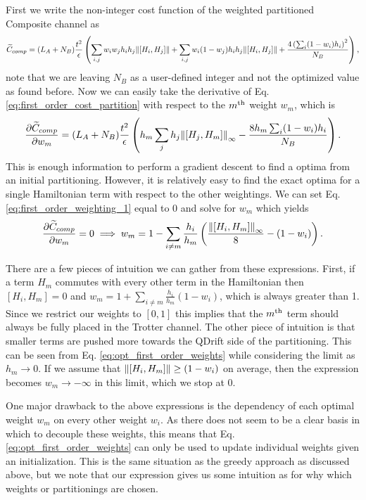 First we write the non-integer cost function of the weighted partitioned Composite channel as
\begin{equation}
    \widetilde{C}_{comp} = (L_A + N_B) \frac{t^2}{\epsilon} \left( \sum_{i,j} w_i w_j h_i h_j \norm{[H_i, H_j]} + \sum_{i, j} w_i (1 - w_j) h_i h_j \norm{[H_i, H_j]} + \frac{4 \left( \sum_i (1-w_i) h_i \right)^2 }{N_B}  \right), \label{eq:first_order_cost_partition}
\end{equation}
note that we are leaving $N_B$ as a user-defined integer and not the optimized value as found before. Now we can easily take the derivative of Eq. 
\eqref{eq:first_order_cost_partition} with respect to the $m\textsuperscript{th}$ weight $w_m$, which is
\begin{equation}
    \frac{\partial \widetilde{C}_{comp}}{\partial w_m} = (L_A + N_B) \frac{t^2}{\epsilon} \left(  h_m \sum_j h_j \norm{[H_j, H_m]}_\infty -  \frac{8 h_m \sum_i (1-w_i) h_i}{N_B}  \right) \label{eq:first_order_weighting_1}.
\end{equation}
This is enough information to perform a gradient descent to find a optima from an initial partitioning. However, it is relatively easy to
find the exact optima for a single Hamiltonian term with respect to the other weightings. We can set Eq. \eqref{eq:first_order_weighting_1} equal to 0 and solve for $w_m$ which yields
\begin{equation}
    \frac{\partial \widetilde{C}_{comp}}{\partial w_m} =0 \implies w_m = 1 - \sum_{i \neq m} \frac{h_i}{h_m} \left( \frac{\norm{[H_i, H_m]}_{\infty}}{8} - (1-w_i) \right). \label{eq:opt_first_order_weights}
\end{equation}

There are a few pieces of intuition we can gather from these expressions. First, if a term $H_m$ commutes with every other term in the Hamiltonian then $[H_i, H_m] = 0$ and $w_m = 1 + \sum_{i \neq m} \frac{h_i}{h_m} (1-w_i)$, which is always greater than 1. Since we restrict our weights to $[0,1]$ this implies that the $m\textsuperscript{th}$ term should always be fully placed in the Trotter channel. The other piece of intuition is that smaller terms are pushed more towards the QDrift side of the partitioning. This can be seen from Eq. \eqref{eq:opt_first_order_weights} while considering the limit as $h_m \to 0$. If we assume that $\norm{[H_i, H_m]} \geq (1-w_i)$ on average, then the expression becomes $w_m \to -\infty$ in this limit, which we stop at 0.

One major drawback to the above expressions is the dependency of each optimal weight $w_m$ on every other weight $w_i$. As there does not seem
to be a clear basis in which to decouple these weights, this means that Eq. \eqref{eq:opt_first_order_weights} can only be used to update individual
weights given an initialization. This is the same situation as the greedy approach as discussed above, but we note that our expression gives us some
intuition as for why which weights or partitionings are chosen.

